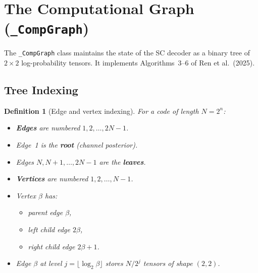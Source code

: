 \documentclass[11pt,a4paper]{article}
\newtheorem{definition}{Definition}[section]
\begin{document}
\section{The Computational Graph (\texttt{\_CompGraph})}
\label{sec:compgraph}

The \texttt{\_CompGraph} class maintains the state of the SC decoder as a binary tree of $2 \times 2$ log-probability tensors. It implements Algorithms~3--6 of Ren et al.\ (2025).

\subsection{Tree Indexing}

\begin{definition}[Edge and vertex indexing]
For a code of length $N = 2^n$:
\begin{itemize}
    \item \textbf{Edges} are numbered $1, 2, \ldots, 2N - 1$.
    \item Edge~1 is the \textbf{root} (channel posterior).
    \item Edges $N, N+1, \ldots, 2N-1$ are the \textbf{leaves}.
    \item \textbf{Vertices} are numbered $1, 2, \ldots, N-1$.
    \item Vertex $\beta$ has:
    \begin{itemize}
        \item parent edge $\beta$,
        \item left child edge $2\beta$,
        \item right child edge $2\beta + 1$.
    \end{itemize}
    \item Edge $\beta$ at level $j = \lfloor \log_2 \beta \rfloor$ stores $N / 2^j$ tensors of shape $(2, 2)$.
\end{itemize}
\end{definition}
\end{document}
